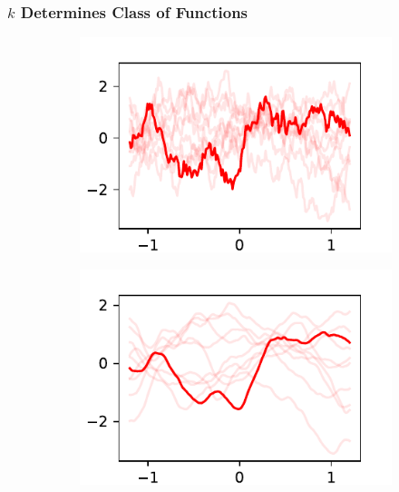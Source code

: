 \documentclass{beamer}
\begin{document}
\begin{frame}
    \frametitle{$k$ Determines Class of Functions}
    \begin{figure}
        \centering
        \begin{subfigure}[t]{0.4\textwidth}
            \centering
            \includegraphics[width=\textwidth]{maternonehalf_kernel.pdf}
        \end{subfigure}%
        \begin{subfigure}[t]{0.4\textwidth}
            \centering
            \includegraphics[width=\textwidth]{maternthreehalves_kernel.pdf}
        \end{subfigure}
        \begin{subfigure}[t]{0.4\textwidth}
            \centering

\end{subfigure}
\end{figure}
\end{frame}
\end{document}
